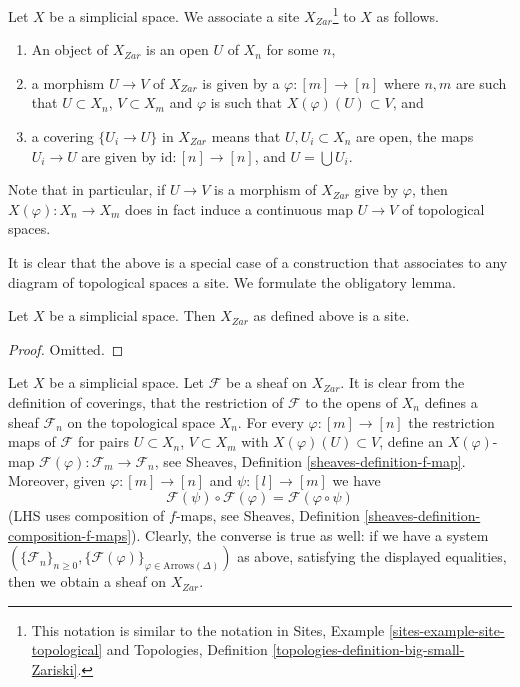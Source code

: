 \medskip\noindent
Let $X$ be a simplicial space. We associate a site
$X_{Zar}$\footnote{This notation is similar to the notation in
Sites, Example \ref{sites-example-site-topological}
and
Topologies, Definition \ref{topologies-definition-big-small-Zariski}.}
to $X$ as follows.
\begin{enumerate}
\item An object of $X_{Zar}$ is an open $U$ of $X_n$ for some $n$,
\item a morphism $U \to V$ of $X_{Zar}$ is given by a
$\varphi : [m] \to [n]$ where $n, m$ are such that
$U \subset X_n$, $V \subset X_m$ and $\varphi$ is such that
$X(\varphi)(U) \subset V$, and
\item a covering $\{U_i \to U\}$ in $X_{Zar}$ means
that $U, U_i \subset X_n$ are open, the maps $U_i \to U$ are
given by $\text{id} : [n] \to [n]$, and $U = \bigcup U_i$.
\end{enumerate}
Note that in particular, if $U \to V$ is a morphism of $X_{Zar}$
give by $\varphi$, then $X(\varphi) : X_n \to X_m$ does in fact
induce a continuous map $U \to V$ of topological spaces.

\noindent
It is clear that the above is a special case of a construction that
associates to any diagram of topological spaces a site. We formulate
the obligatory lemma.

\begin{lemma}
\label{lemma-simplicial-site}
Let $X$ be a simplicial space. Then $X_{Zar}$
as defined above is a site.
\end{lemma}

\begin{proof}
Omitted.
\end{proof}

\noindent
Let $X$ be a simplicial space. Let $\mathcal{F}$ be a sheaf on $X_{Zar}$.
It is clear from the definition of coverings, that the restriction
of $\mathcal{F}$ to the opens of $X_n$ defines a sheaf $\mathcal{F}_n$
on the topological space $X_n$. For every $\varphi : [m] \to [n]$ the
restriction maps of $\mathcal{F}$ for pairs $U \subset X_n$, $V \subset X_m$
with $X(\varphi)(U) \subset V$, define an $X(\varphi)$-map
$\mathcal{F}(\varphi) : \mathcal{F}_m \to \mathcal{F}_n$, see
Sheaves, Definition \ref{sheaves-definition-f-map}.
Moreover, given $\varphi : [m] \to [n]$ and $\psi : [l] \to [m]$
we have
$$
\mathcal{F}(\psi) \circ \mathcal{F}(\varphi) =
\mathcal{F}(\varphi \circ \psi)
$$
(LHS uses composition of $f$-maps, see
Sheaves, Definition \ref{sheaves-definition-composition-f-maps}).
Clearly, the converse is true as well: if we have a system
$(\{\mathcal{F}_n\}_{n \geq 0},
\{\mathcal{F}(\varphi)\}_{\varphi \in \text{Arrows}(\Delta)})$
as above, satisfying the displayed equalities,
then we obtain a sheaf on $X_{Zar}$.

